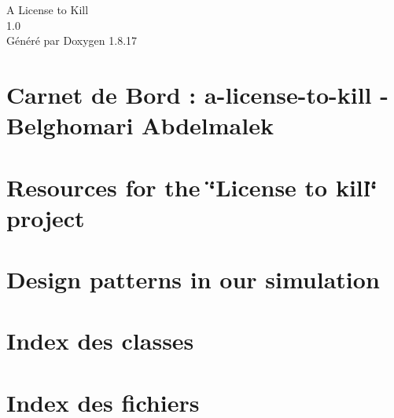 \let\mypdfximage\pdfximage\def\pdfximage{\immediate\mypdfximage}\documentclass[twoside]{book}
\newcommand{\+}{\discretionary{\mbox{\scriptsize$\hookleftarrow$}}{}{}}
\newcommand{\clearemptydoublepage}{%
  \newpage{\pagestyle{empty}\cleardoublepage}%
}
\begin{document}
\hypersetup{pageanchor=false,
             bookmarksnumbered=true,
             pdfencoding=unicode
            }
\begin{titlepage}
\vspace*{7cm}
\begin{center}%
{\Large A License to Kill \\[1ex]\large 1.\+0 }\\
\vspace*{1cm}
{\large Généré par Doxygen 1.8.17}\\
\end{center}
\end{titlepage}
\clearemptydoublepage
{}
\tableofcontents
\clearemptydoublepage
{}
\hypersetup{pageanchor=true}

\chapter{Carnet de Bord \+: a-\/license-\/to-\/kill -\/ Belghomari Abdelmalek}
\label{md_doc_carnet_de_bord}

\chapter{Resources for the \char`\"{}\+License to kill\char`\"{} project}
\label{md_README}

\chapter{Design patterns in our simulation}
\label{md_src_pattern_examples_README}

\chapter{Index des classes}

\chapter{Index des fichiers}

\end{document}
